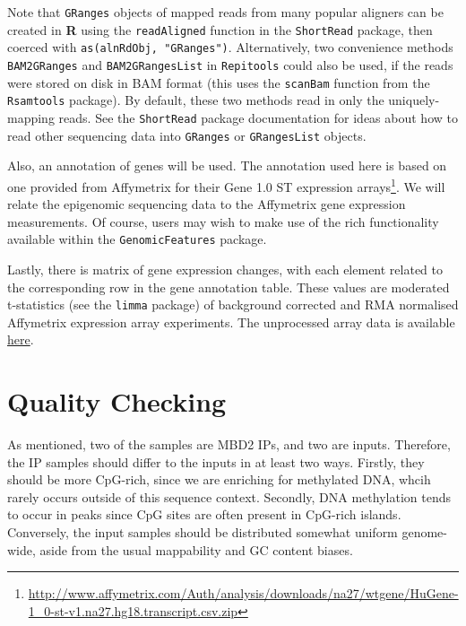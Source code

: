 \documentclass[a4paper, 12pt]{article}
\begin{document}
Note that \texttt{GRanges} objects of mapped reads from many popular aligners can be created in \textbf{R} using the \texttt{readAligned} function in the \texttt{ShortRead} package, then coerced with \texttt{as(alnRdObj, "GRanges")}. Alternatively, two convenience methods \texttt{BAM2GRanges} and \texttt{BAM2GRangesList} in \texttt{Repitools} could also be used, if the reads were stored on disk in BAM format (this uses the \texttt{scanBam} function from the \texttt{Rsamtools} package). By default, these two methods read in only the uniquely-mapping reads. See the \texttt{ShortRead} package documentation for ideas about how to read other sequencing data into \texttt{GRanges} or \texttt{GRangesList} objects.



Also, an annotation of genes will be used. The annotation used here is based on one provided from Affymetrix for their Gene 1.0 ST expression arrays\footnote{\href{http://www.affymetrix.com/Auth/analysis/downloads/na27/wtgene/HuGene-1\_0-st-v1.na27.hg18.transcript.csv.zip}{http://www.affymetrix.com/Auth/analysis/downloads/na27/wtgene/HuGene-1\_0-st-v1.na27.hg18.transcript.csv.zip}}. We will relate the epigenomic sequencing data to the Affymetrix gene expression measurements.  Of course, users may wish to make use of the rich functionality available within the \texttt{GenomicFeatures} package.
 


\noindent Lastly, there is matrix of gene expression changes, with each element related to the corresponding row in the gene annotation table. These values are moderated t-statistics (see the \texttt{limma} package) of background corrected and RMA normalised Affymetrix expression array experiments. The unprocessed array data is available \href{http://www.ncbi.nlm.nih.gov/geo/query/acc.cgi?acc=GSE19726}{here}.



\section{Quality Checking}
As mentioned, two of the samples are MBD2 IPs, and two are inputs. Therefore, the IP samples should differ to the inputs in at least two ways. Firstly, they should be more CpG-rich, since we are enriching for methylated DNA, whcih rarely occurs outside of this sequence context. Secondly, DNA methylation tends to occur in peaks since CpG sites are often present in CpG-rich islands.  Conversely, the input samples should be distributed somewhat uniform genome-wide, aside from the usual mappability and GC content biases.\\
\end{document}
